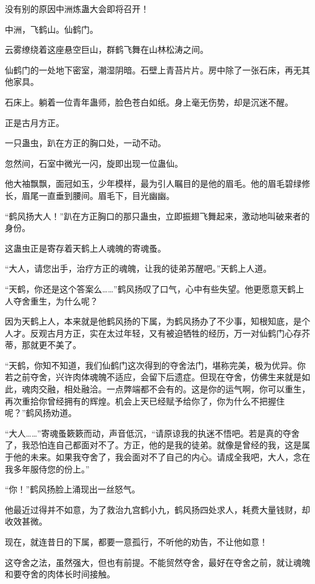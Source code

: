 \begin{this_body}
没有别的原因中洲炼蛊大会即将召开！

中洲，飞鹤山。仙鹤门。

云雾缭绕着这座悬空巨山，群鹤飞舞在山林松涛之间。

仙鹤门的一处地下密室，潮湿阴暗。石壁上青苔片片。房中除了一张石床，再无其他家具。

石床上。躺着一位青年蛊师，脸色苍白如纸。身上毫无伤势，却是沉迷不醒。

正是古月方正。

一只蛊虫，趴在方正的胸口处，一动不动。

忽然间，石室中微光一闪，旋即出现一位蛊仙。

他大袖飘飘，面冠如玉，少年模样，最为引人瞩目的是他的眉毛。他的眉毛碧绿修长，眉尾一直垂到腰间。眉毛下，目光幽幽。

“鹤风扬大人！”趴在方正胸口的那只蛊虫，立即振翅飞舞起来，激动地叫破来者的身份。

这蛊虫正是寄存着天鹤上人魂魄的寄魂蚤。

“大人，请您出手，治疗方正的魂魄，让我的徒弟苏醒吧。”天鹤上人道。

“天鹤，你还是这个答案么……”鹤风扬叹了口气，心中有些失望。他更愿意天鹤上人夺舍重生，为什么呢？

因为天鹤上人，本来就是他鹤风扬的下属，为鹤风扬办了不少事，知根知底，是个人才。反观古月方正，实在太过年轻，又有被迫牺牲的经历，万一对仙鹤门心存芥蒂，那就更不美了。

“天鹤，你知不知道，我们仙鹤门这次得到的夺舍法门，堪称完美，极为优异。你若之前夺舍，兴许肉体魂魄不适应，会留下后遗症。但现在夺舍，仿佛生来就是如此，魂肉交融，相处融洽。一点弊端都不会有的。这是你的运气啊，你可以重生，再次重拾你曾经拥有的辉煌。机会上天已经赋予给你了，你为什么不把握住呢？”鹤风扬劝道。

“大人……”寄魂蚤簌簌而动，声音低沉，“请原谅我的执迷不悟吧。若是真的夺舍了，我恐怕连自己都面对不了。方正，他的是我的徒弟。就像是曾经的我，这是属于他的未来。如果我夺舍了，我会面对不了自己的内心。请成全我吧，大人，念在我多年服侍您的份上。”

“你！”鹤风扬脸上涌现出一丝怒气。

他最近过得并不如意，为了救治九宫鹤小九，鹤风扬四处求人，耗费大量钱财，却收效甚微。

现在，就连昔日的下属，都要一意孤行，不听他的劝告，不让他如意！

这夺舍之法，虽然强大，但也有前提。不能贸然夺舍，最好在夺舍之前，就让魂魄和要夺舍的肉体长时间接触。


\end{this_body}
